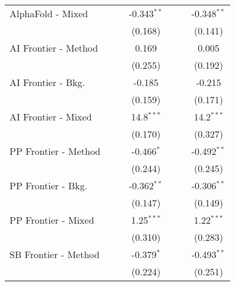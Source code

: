 \begin{tabular}{lcccccc}
   AlphaFold - Mixed    &                &                & -0.343$^{**}$  &                &               & -0.348$^{**}$\\   
                        &                &                & (0.168)        &                &               & (0.141)\\   
   AI Frontier - Method &                &                & 0.169          &                &               & 0.005\\   
                        &                &                & (0.255)        &                &               & (0.192)\\   
   AI Frontier - Bkg.   &                &                & -0.185         &                &               & -0.215\\   
                        &                &                & (0.159)        &                &               & (0.171)\\   
   AI Frontier - Mixed  &                &                & 14.8$^{***}$   &                &               & 14.2$^{***}$\\   
                        &                &                & (0.170)        &                &               & (0.327)\\   
   PP Frontier - Method &                &                & -0.466$^{*}$   &                &               & -0.492$^{**}$\\   
                        &                &                & (0.244)        &                &               & (0.245)\\   
   PP Frontier - Bkg.   &                &                & -0.362$^{**}$  &                &               & -0.306$^{**}$\\   
                        &                &                & (0.147)        &                &               & (0.149)\\   
   PP Frontier - Mixed  &                &                & 1.25$^{***}$   &                &               & 1.22$^{***}$\\   
                        &                &                & (0.310)        &                &               & (0.283)\\   
   SB Frontier - Method &                &                & -0.379$^{*}$   &                &               & -0.493$^{**}$\\   
                        &                &                & (0.224)        &                &               & (0.251)\\   

\end{tabular}
